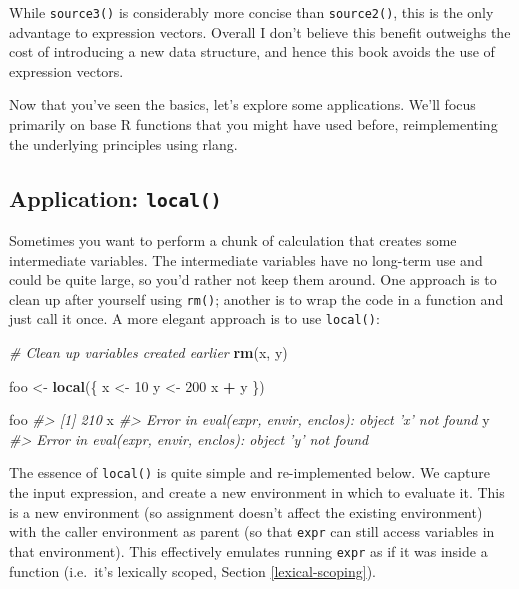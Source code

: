 \documentclass[]{book}
\makeatletter
\newenvironment{Shaded}{\begin{snugshade}}{\end{snugshade}}
\newcommand{\CommentTok}[1]{\textcolor[rgb]{0.37,0.37,0.37}{\textit{#1}}}
\newcommand{\DecValTok}[1]{\textcolor[rgb]{0.06,0.06,0.06}{#1}}
\newcommand{\KeywordTok}[1]{\textcolor[rgb]{0.27,0.27,0.27}{\textbf{#1}}}
\newcommand{\NormalTok}[1]{#1}
\newcommand{\OperatorTok}[1]{\textcolor[rgb]{0.43,0.43,0.43}{\textbf{#1}}}
\newcommand{\StringTok}[1]{\textcolor[rgb]{0.5,0.5,0.5}{#1}}
\newcommand{\indexc}[1]{\index{#1@\texttt{#1}}}
\makeatother
\begin{document}
While \texttt{source3()} is considerably more concise than \texttt{source2()}, this is the only advantage to expression vectors. Overall I don't believe this benefit outweighs the cost of introducing a new data structure, and hence this book avoids the use of expression vectors.

Now that you've seen the basics, let's explore some applications. We'll focus primarily on base R functions that you might have used before, reimplementing the underlying principles using rlang.

\hypertarget{application-local}{%
\subsection{\texorpdfstring{Application: \texttt{local()}}{Application: local()}}\label{application-local}}

\indexc{local()}

Sometimes you want to perform a chunk of calculation that creates some intermediate variables. The intermediate variables have no long-term use and could be quite large, so you'd rather not keep them around. One approach is to clean up after yourself using \texttt{rm()}; another is to wrap the code in a function and just call it once. A more elegant approach is to use \texttt{local()}:

\begin{Shaded}
\begin{Highlighting}[]
\CommentTok{# Clean up variables created earlier}
\KeywordTok{rm}\NormalTok{(x, y)}

\NormalTok{foo <-}\StringTok{ }\KeywordTok{local}\NormalTok{(\{}
\NormalTok{  x <-}\StringTok{ }\DecValTok{10}
\NormalTok{  y <-}\StringTok{ }\DecValTok{200}
\NormalTok{  x }\OperatorTok{+}\StringTok{ }\NormalTok{y}
\NormalTok{\})}

\NormalTok{foo}
\CommentTok{#> [1] 210}
\NormalTok{x}
\CommentTok{#> Error in eval(expr, envir, enclos): object 'x' not found}
\NormalTok{y}
\CommentTok{#> Error in eval(expr, envir, enclos): object 'y' not found}
\end{Highlighting}
\end{Shaded}

The essence of \texttt{local()} is quite simple and re-implemented below. We capture the input expression, and create a new environment in which to evaluate it. This is a new environment (so assignment doesn't affect the existing environment) with the caller environment as parent (so that \texttt{expr} can still access variables in that environment). This effectively emulates running \texttt{expr} as if it was inside a function (i.e.~it's lexically scoped, Section \ref{lexical-scoping}).
\end{document}
